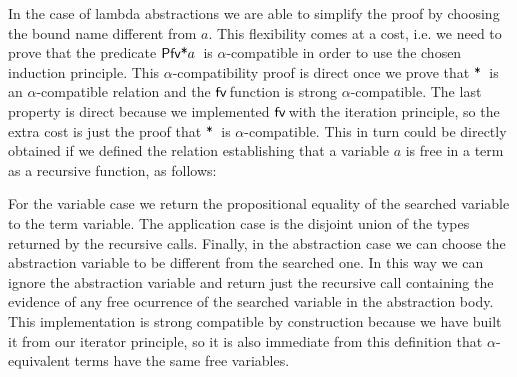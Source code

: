 \documentclass{entcs}
\newcommand{\alp}{\ensuremath{\alpha}}
\newcommand{\lambAg}[2]{\ensuremath{\AgdaInductiveConstructor{ƛ}\, #1\, #2}}
\newcommand{\inAg}{\ensuremath{\mathbin{\AgdaFunction{∈}}}}
\newcommand{\neqAg}{\ensuremath{\mathbin{\AgdaInductiveConstructor{≢}}}}
\newcommand{\fv}{\ensuremath{{\AgdaFunction{fv}}\,}}
\newcommand{\perm}{\ensuremath{\mathbin{\AgdaFunction{∙}}}}
\newcommand{\free}{\ensuremath{\mathbin{\AgdaFunction{*}}}}
\newcommand{\choiceAg}{\ensuremath{\AgdaFunction{χ}\,}}
\begin{document}
\noindent In the  case of lambda abstractions we are able to simplify the proof by choosing the bound name different from $a$. 
This flexibility comes at a cost, i.e. we need to prove that the predicate $\AgdaFunction{Pfv*} a$\ is \alp-compatible in order to use the chosen induction principle. This \alp-compatibility proof is direct once we prove that \free\ is an \alp-compatible relation and the \fv function is strong \alp-compatible. The last property is direct because we implemented \fv with the iteration principle, so the extra cost is just the proof that \free\ is \alp-compatible. This in turn could be directly obtained if we defined the relation establishing that a variable $a$ is free in a term as a recursive function, as follows:

 \hspace{5px}

\noindent For the variable case we return the propositional equality of the searched variable to the term variable. The application case is the disjoint union of the types returned by the recursive calls. Finally, in the abstraction case we can choose the abstraction variable to be different from the searched one. In this way we can ignore the abstraction variable and return just the recursive call containing the evidence of any free ocurrence of the searched variable in the abstraction body. 
This implementation is strong compatible by construction because we have built it from our iterator principle, so it is also immediate from this definition that $\alpha$-equivalent terms have the same free variables.
\end{document}
